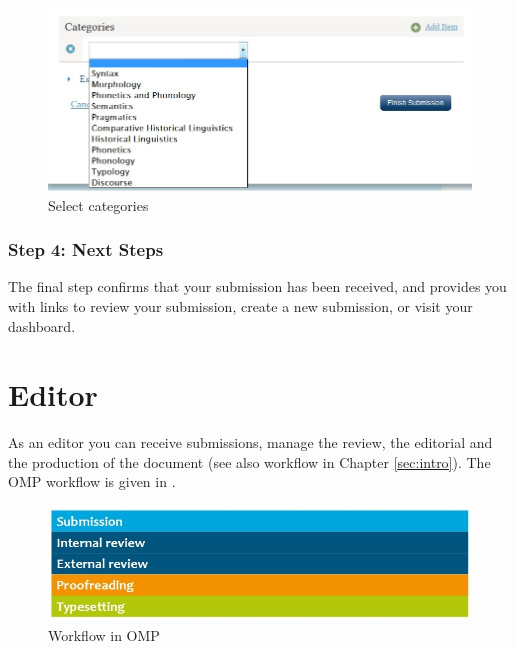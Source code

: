 \begin{figure}[h] \centering 
\includegraphics[width=1\textwidth]{./img/submission-7.jpg} 
\caption{Select categories}
\label{fig:submission7}
\end{figure}

\subsection*{Step 4: Next Steps}

The final step confirms that your submission has been received, and provides you with links to review your submission, create a new submission, or visit your dashboard. 





\chapter{Editor} \label{sec:editor}

As an editor you can receive submissions, manage the review, the editorial and the production of the document (see also workflow in Chapter \ref{sec:intro}). The OMP workflow is given in .

\begin{figure}[h] \centering
\includegraphics[width=1\textwidth]{./img/workflow_omp.jpg} \caption{Workflow in OMP}
\label{fig:workflowOmp}
\end{figure}

